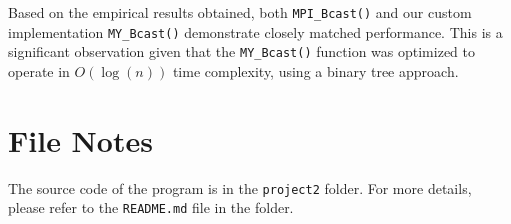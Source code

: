\documentclass[12pt,a4paper]{article}
\begin{document}
Based on the empirical results obtained, 
both \texttt{MPI\_Bcast()} and our custom implementation \texttt{MY\_Bcast()} demonstrate closely matched performance. 
This is a significant observation given that the \texttt{MY\_Bcast()} function was optimized to operate in \(O(\log(n))\) time complexity, 
using a binary tree approach.

\section*{File Notes}
The source code of the program is in the \texttt{project2} folder. 
For more details, please refer to the \texttt{README.md} file in the folder.
\end{document}
